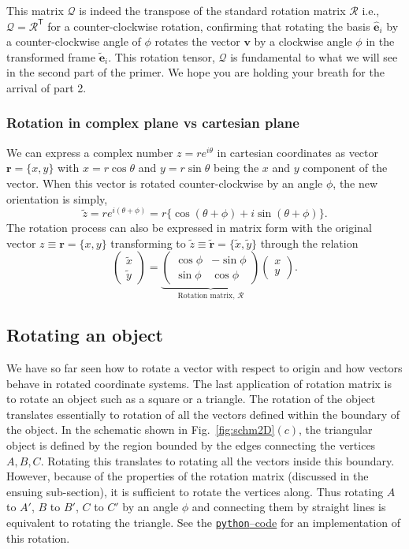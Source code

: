 \documentclass{article}
\def\eh{\hat{\mathbf{e}}}
\def\et{\tilde{\mathbf{e}}}
\def\r{\mathbf{r}}
\def\rt{\tilde{\mathbf{r}}}
\def\zt{\tilde{z}}
\def\xt{\tilde{x}}
\def\yt{\tilde{y}}
\def\v{\mathbf{v}}
\def\R{\mathcal{R}}
\def\Q{\mathcal{Q}}
\def\T{\mathsf{T}}
\begin{document}
\noindent This matrix $\Q$ is indeed the transpose of the standard rotation matrix $\R$ i.e., $\Q = \R^\T$ for a counter-clockwise rotation, confirming that rotating the basis $\eh_i$ by a counter-clockwise angle of $\phi$ rotates the vector $\v$ by a clockwise angle $\phi$ in the transformed frame $\et_i$. This rotation tensor, $\Q$ is fundamental to what we will see in the second part of the primer. We hope you are holding your breath for the arrival of part 2.

\subsubsection*{Rotation in complex plane vs cartesian plane}
We can express a complex number $z = re^{i\theta}$ in cartesian coordinates as vector $\r = \{ x, y\}$ with $x = r\cos\theta$ and $y = r\sin\theta$ being the $x$ and $y$ component of the vector. When this vector is rotated counter-clockwise by an angle \( \phi \), the new orientation is simply,
\[
  \zt = re^{i(\theta + \phi)} = r\{\cos(\theta + \phi) + i\sin(\theta + \phi)\}.
\]
\noindent The rotation process can also be expressed in matrix form with the original vector $z \equiv \r = \{x, y\}$ transforming to $\zt \equiv \rt = \{ \xt, \yt\}$ through the relation
\[
  \begin{pmatrix}
    \xt \\
    \yt
  \end{pmatrix} =
  \underbrace{
  \begin{pmatrix}
    \cos\phi & -\sin\phi \\
    \sin\phi & \cos\phi
  \end{pmatrix}}_{\text{Rotation matrix, }\R}
  \begin{pmatrix}
    x \\
    y
  \end{pmatrix}.
\]


\subsection{Rotating an object}
We have so far seen how to rotate a vector with respect to origin and how vectors behave in rotated coordinate systems. The last application of rotation matrix is to rotate an object such as a square or a triangle. The rotation of the object translates essentially to rotation of all the vectors defined within the boundary of the object. In the schematic shown in Fig.~\ref{fig:schm2D}$(c)$, the triangular object is defined by the region bounded by the edges connecting the vertices $A, B, C$. Rotating this translates to rotating all the vectors inside this boundary. However, because of the properties of the rotation matrix (discussed in the ensuing sub-section), it is sufficient to rotate the vertices along. Thus rotating $A$ to $A'$, $B$ to $B'$, $C$ to $C'$ by an angle $\phi$ and connecting them by straight lines is equivalent to rotating the triangle. See the \href{https://github.com/sgangaprasath/RotationTut/blob/main/Rotations.ipynb}{\texttt{python}--code} for an implementation of this rotation.
\end{document}
